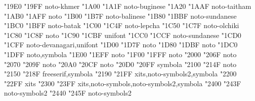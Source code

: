 \documentclass{article}
\begin{document}
                                  {  "19E0} {  "19FF} {noto-khmer}
                                       {  "1A00} {  "1A1F} {noto-buginese}
                                       {  "1A20} {  "1AAF} {noto-taitham}
           {  "1AB0} {  "1AFF} {noto}
                                       {  "1B00} {  "1B7F} {noto-balinese}
                                      {  "1B80} {  "1BBF} {noto-sundanese}
                                          {  "1BC0} {  "1BFF} {noto-batak}
                                         {  "1C00} {  "1C4F} {noto-lepcha}
                                       {  "1C50} {  "1C7F} {noto-olchiki}
                            {  "1C80} {  "1C8F} {noto}
                              {  "1C90} {  "1CBF} {unifont}
                           {  "1CC0} {  "1CCF} {noto-sundanese}
                               {  "1CD0} {  "1CFF} {noto-devanagari,unifont}
                            {  "1D00} {  "1D7F} {noto}
                 {  "1D80} {  "1DBF} {noto}
         {  "1DC0} {  "1DFF} {noto,symbola}
                      {  "1E00} {  "1EFF} {noto}
                                 {  "1F00} {  "1FFF} {noto}
                            {  "2000} {  "206F} {noto}
                    {  "2070} {  "209F} {noto}
                               {  "20A0} {  "20CF} {noto}
        {  "20D0} {  "20FF} {symbola}
                             {  "2100} {  "214F} {noto}
                                   {  "2150} {  "218F} {freeserif,symbola}
                                         {  "2190} {  "21FF} {xits,noto-symbols2,symbola}
                         {  "2200} {  "22FF} {xits}
                        {  "2300} {  "23FF} {xits,noto-symbols,noto-symbols2,symbola}
                               {  "2400} {  "243F} {noto-symbols2}
                  {  "2440} {  "245F} {noto-symbols2}
\end{document}
